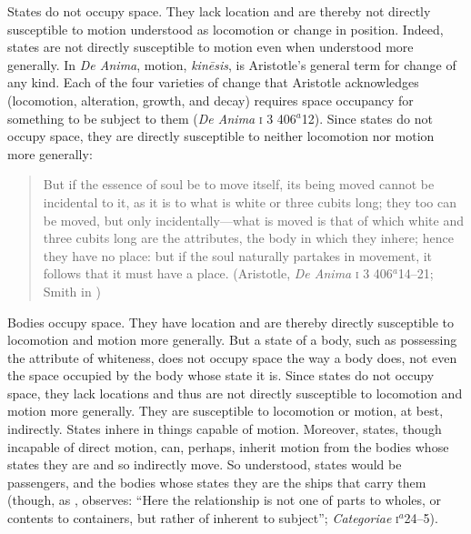 States do not occupy space. They lack location and are there\-by not directly susceptible to motion understood as locomotion or change in position. Indeed, states are not directly susceptible to motion even when understood more generally. In \emph{De Anima}, motion, \emph{kinēsis}, is Aristotle's general term for change of any kind. Each of the four varieties of change that Aristotle acknowledges (locomotion, alteration, growth, and decay) requires space occupancy for something to be subject to them (\emph{De Anima} \textsc{i} 3 406\( ^{a} \)12). Since states do not occupy space, they are directly susceptible to neither locomotion nor motion more generally:
\begin{quote}
	But if the essence of soul be to move itself, its being moved cannot be incidental to it, as it is to what is white or three cubits long; they too can be moved, but only incidentally---what is moved is that of which white and three cubits long are the attributes, the body in which they inhere; hence they have no place: but if the soul naturally partakes in movement, it follows that it must have a place. (Aristotle, \emph{De Anima} \textsc{i} 3 406\( ^{a} \)14--21; Smith in \citealt[9]{Barnes:1984uq})
\end{quote}
Bodies occupy space. They have location and are there\-by directly susceptible to locomotion and motion more generally. But a state of a body, such as possessing the attribute of whiteness, does not occupy space the way a body does, not even the space occupied by the body whose state it is. Since states do not occupy space, they lack locations and thus are not directly susceptible to locomotion and motion more generally. They are susceptible to locomotion or motion, at best, indirectly. States inhere in things capable of motion. Moreover, states, though incapable of direct motion, can, perhaps, inherit motion from the bodies whose states they are and so indirectly move. So understood, states would be passengers, and the bodies whose states they are the ships that carry them (though, as \citealt[174]{Witt:1995kx}, observes: ``Here the relationship is not one of parts to wholes, or contents to containers, but rather of inherent to subject''; \emph{Categoriae} \textsc{i}\( ^{a} \)24--5).

